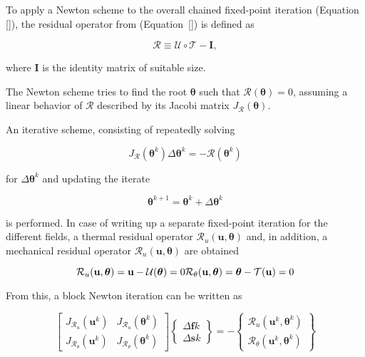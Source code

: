To apply a Newton scheme to the overall chained fixed-point iteration (Equation \eqref{}), the residual operator from (Equation~\eqref{}) is defined as

$$
\mathcal{R}\equiv\mathcal{U} \circ \mathcal {T}-\boldsymbol{I},
$$

where $\boldsymbol{I}$ is the identity matrix of suitable size.

The Newton scheme tries to find the root $\boldsymbol \theta$ such that $\mathcal R(\boldsymbol \theta)=0$, assuming a linear behavior of $\mathcal R$ described by its Jacobi matrix $J_{\mathcal R}(\boldsymbol \theta)$.

An iterative scheme, consisting of repeatedly solving

$$
J_{\mathcal R}\left(\boldsymbol \theta^{k}\right) \Delta \boldsymbol \theta^{k}=-\mathcal R\left(\boldsymbol \theta^{k}\right)
$$

for $\Delta \boldsymbol \theta^{k}$ and updating the iterate

$$
\boldsymbol \theta^{k+1}= \boldsymbol \theta^{k}+\Delta \boldsymbol \theta^{k}
$$

is performed.
In case of writing up a separate fixed-point iteration for the different fields, a thermal residual operator $\mathcal{R}_{u}(\mathbf{u}, \boldsymbol{\theta})$ and, in addition, a mechanical residual operator $\mathcal{R}_{u}(\mathbf{u}, \boldsymbol{\theta})$ are obtained

$$
\mathcal{R}_{u}(\mathbf{u}, \boldsymbol{\theta})=\mathbf{u}-\mathcal{U}(\boldsymbol{\theta})=0 \\
\mathcal{R}_{\theta}(\mathbf{u}, \boldsymbol{\theta})=\boldsymbol{\theta}-\mathcal{T}(\mathbf{u})=0
$$

From this, a block Newton iteration can be written as

$$
\left[\begin{array}{ll}J_{\mathcal R_{u}}\left(\mathbf{u}^{k}\right) & J_{\mathcal{R}_{u}}\left(\boldsymbol{\theta}^{k}\right) \\[7pt] J_{\mathcal{R}_{\theta}}\left(\mathbf{u}^{k}\right) & J_{\mathcal{R}_{\theta}}\left(\boldsymbol{\theta}^{k}\right)\end{array}\right]
\left\{\begin{array}{c}\Delta \boldsymbol{f}{k} \\ \Delta \boldsymbol{s}{k}\end{array}\right\}=-\left\{\begin{array}{l}\mathcal{R}_{u}\left(\mathbf{u}^{k}, \boldsymbol{\theta}^{k}\right) \\ \mathcal{R}_{\theta}\left(\mathbf{u}^{k}, \boldsymbol{\theta}^{k}\right)\end{array}\right\}
$$

